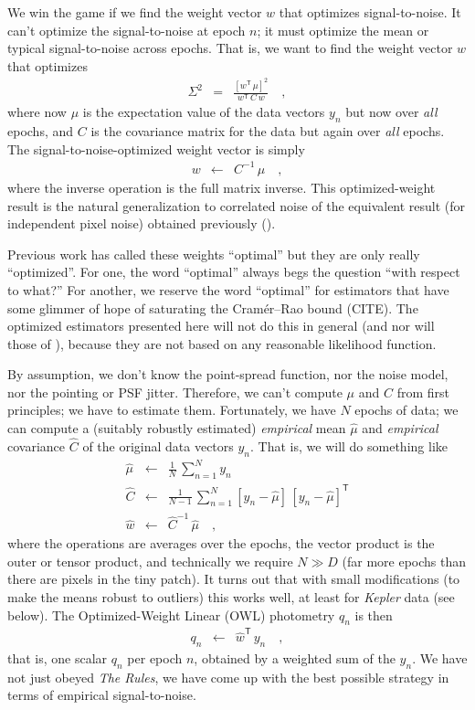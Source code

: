 \documentclass[12pt, letterpaper, preprint]{aastex}
\newcommand{\project}[1]{\textsl{#1}}
\newcommand{\transpose}[1]{{#1}^{\!\mathsf T}}
\newcommand{\inverse}[1]{{#1}^{-1}}
\begin{document}
We win the game if we find the weight vector $w$ that optimizes signal-to-noise.
It can't optimize the signal-to-noise at epoch $n$;
  it must optimize the mean or typical signal-to-noise across epochs.
That is, we want to find the weight vector $w$ that optimizes
\begin{eqnarray}
  \Sigma^2 &=& \frac{[\transpose{w}\, \mu]^2}{\transpose{w}\, C\, w}
  \quad ,
\end{eqnarray}
where now $\mu$ is the expectation value of the data vectors $y_n$ but now over \emph{all} epochs,
  and $C$ is the covariance matrix for the data but again over \emph{all} epochs.
The signal-to-noise-optimized weight vector is simply
\begin{eqnarray}
  w &\leftarrow& \inverse{C}\, \mu
  \quad ,
\end{eqnarray}
  where the inverse operation is the full matrix inverse.
This optimized-weight result is the natural generalization to correlated noise
  of the equivalent result (for independent pixel noise)
  obtained previously (\citealt{naylor}).

Previous work has called these weights ``optimal'' but they are only really ``optimized''.
For one, the word ``optimal'' always begs the question ``with respect to what?''
For another, we reserve the word ``optimal'' for estimators
  that have some glimmer of hope of saturating the Cram\'er--Rao bound (CITE).
The optimized estimators presented here will not do this in general
  (and nor will those of \citealt{naylor}),
  because they are not based on any reasonable likelihood function.

By assumption, we don't know the point-spread function,
  nor the noise model,
  nor the pointing or PSF jitter.
Therefore, we can't compute $\mu$ and $C$ from first principles; we have to estimate them.
Fortunately, we have $N$ epochs of data;
  we can compute a (suitably robustly estimated)
  \emph{empirical} mean $\hat{\mu}$ and \emph{empirical} covariance $\hat{C}$
  of the original data vectors $y_n$.
That is, we will do something like
\begin{eqnarray}
  \hat{\mu} &\leftarrow& \frac{1}{N}\,\sum_{n=1}^N y_n
  \\
  \hat{C} &\leftarrow& \frac{1}{N-1}\,\sum_{n=1}^N [y_n - \hat{\mu}]\,\transpose{[y_n - \hat{\mu}]}
  \\
  \hat{w} &\leftarrow& \inverse{\hat{C}}\, \hat{\mu}
  \quad ,
\end{eqnarray}
  where the operations are averages over the epochs,
  the vector product is the outer or tensor product,
  and technically we require $N \gg D$
  (far more epochs than there are pixels in the tiny patch).
It turns out that with small modifications
  (to make the means robust to outliers)
  this works well, at least for \project{Kepler} data (see below).
The Optimized-Weight Linear (OWL) photometry $q_n$ is then
\begin{eqnarray}
  q_n &\leftarrow& \transpose{\hat{w}}\, y_n
  \quad ,
\end{eqnarray}
  that is, one scalar $q_n$ per epoch $n$, obtained by a weighted sum of the $y_n$.
We have not just obeyed \emph{The Rules},
  we have come up with the best possible strategy in terms of empirical signal-to-noise.
\end{document}
